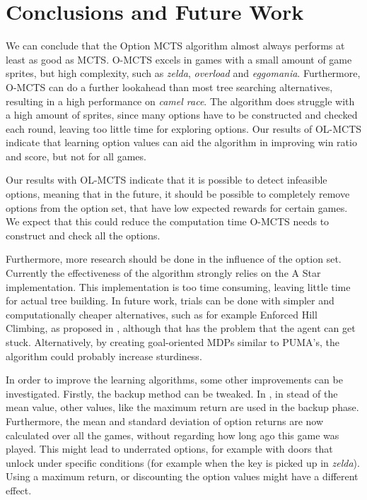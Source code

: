 \chapter{Conclusions and Future Work}
\label{sec:conclusion}
We can conclude that the Option MCTS algorithm almost always performs at least
as good as MCTS. O-MCTS excels in games with a small amount of game sprites, but
high complexity, such as \textit{zelda}, \textit{overload} and \textit{eggomania}.
Furthermore, O-MCTS can do a further lookahead than most tree searching
alternatives, resulting in a high performance on \textit{camel race}. The
algorithm does struggle with a high amount of sprites, since many options have
to be constructed and checked each round, leaving too little time for exploring
options. Our results of OL-MCTS indicate that learning
option values can aid the algorithm in improving win ratio and score, but not
for all games.

Our results with OL-MCTS indicate that it is possible to detect infeasible
options, meaning that in the future, it should be possible to completely remove
options from the option set, that have low expected rewards for certain games.
We expect that this could reduce the computation time O-MCTS needs to construct
and check all the options.

Furthermore, more research should be done in the influence of the option set.
Currently the effectiveness of the algorithm strongly relies on the A Star
implementation. This implementation is too time consuming, leaving
little time for actual tree building. In future work, trials can be done with
simpler and computationally cheaper alternatives, such as for example Enforced
Hill Climbing, as proposed in \cite{ross2014general}, although that has the
problem that the agent can get stuck. Alternatively, by creating goal-oriented
MDPs similar to PUMA's, the algorithm could probably increase sturdiness.

In order to improve the learning algorithms, some other improvements can be
investigated. Firstly, the backup method can be tweaked. In
\cite{coulom2007efficient}, in stead of the mean value, other values, like the
maximum return are used in the backup phase. Furthermore, the mean and standard
deviation of option returns are now calculated over all the games, without
regarding how long ago this game was played. This might lead to underrated
options, for example with doors that unlock under specific conditions (for
example when the key is picked up in \textit{zelda}).  Using a maximum return,
or discounting the option values might have a different effect.

